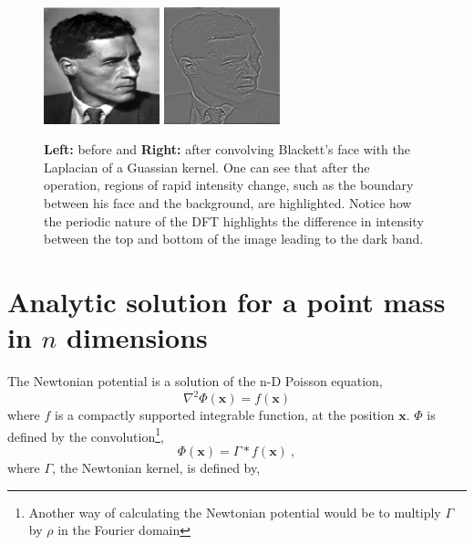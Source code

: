 \documentclass[10pt,a4paper]{article}
\begin{document}
\begin{figure}[h!]
\begin{center}
\includegraphics[width =0.3\textwidth]{Blackett.eps}
\includegraphics[width =0.3\textwidth]{BlackettEdgeDetection.eps}
\caption{\textbf{Left:} before and \textbf{Right:} after convolving Blackett's face with the Laplacian of a Guassian kernel. One can see that after the operation, regions of rapid intensity change, such as the boundary between his face and the background, are highlighted. Notice how the periodic nature of the DFT highlights the difference in intensity between the top and bottom of the image leading to the dark band.}
\label{fig:EdgeDetection}
\end{center}
\end{figure}

\section{Analytic solution for a point mass in $n$ dimensions}
The Newtonian potential is a solution of the n-D Poisson equation,
\begin{equation}
\nabla^2 \Phi(\textbf{x}) = f(\textbf{x})
\end{equation}
where $f$ is a compactly supported integrable function, at the position $\textbf{x}$. $\Phi$ is defined by the convolution\footnote{Another way of calculating the Newtonian potential would be to multiply $\Gamma$ by $\rho$ in the Fourier domain }, 
\begin{equation}
\Phi(\textbf{x}) = \Gamma * f(\textbf{x})\: ,
\end{equation}
where $\Gamma$, the Newtonian kernel, is defined by, 
\end{document}

